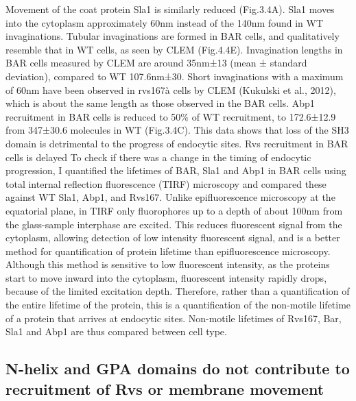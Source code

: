 \documentclass[9pt,lineno]{elife}
\begin{document}
Movement of the coat protein Sla1 is similarly reduced (Fig.3.4A). Sla1 moves into the cytoplasm approximately 60nm instead of the 140nm found in WT invaginations. Tubular invaginations are formed in BAR cells, and qualitatively resemble that in WT cells, as seen by CLEM (Fig.4.4E). Invagination lengths in BAR cells measured by CLEM are around 35nm±13 (mean ± standard deviation), compared to WT 107.6nm±30. Short invaginations with a maximum of 60nm have been observed in rvs167à cells by CLEM (Kukulski et al., 2012), which is about the same length as those observed in the BAR cells. Abp1 recruitment in BAR cells is reduced to 50\% of WT recruitment, to 172.6±12.9 from 347±30.6 molecules in WT (Fig.3.4C). This data shows that loss of the SH3 domain is detrimental to the progress of endocytic sites.
Rvs recruitment in BAR cells is delayed
To check if there was a change in the timing of endocytic progression, I quantified the lifetimes of BAR, Sla1 and Abp1 in BAR cells using total internal reflection fluorescence (TIRF) microscopy and compared these against WT Sla1, Abp1, and Rvs167. Unlike epifluorescence microscopy at the equatorial plane, in TIRF only fluorophores up to a depth of about 100nm from the glass-sample interphase are excited. This reduces fluorescent signal from the cytoplasm, allowing detection of low intensity fluorescent signal, and is a better method for quantification of protein lifetime than epifluorescence microscopy. Although this method is sensitive to low fluorescent intensity, as the proteins start to move inward into the cytoplasm, fluorescent intensity rapidly drops, because of the limited excitation depth. Therefore, rather than a quantification of the entire lifetime of the protein, this is a quantification of the non-motile lifetime of a protein that arrives at endocytic sites. Non-motile lifetimes of Rvs167, Bar, Sla1 and Abp1 are thus compared between cell type.

\subsection{N-helix and GPA domains do not contribute to recruitment of Rvs or membrane movement}
\lipsum[12]
	
\end{document}
